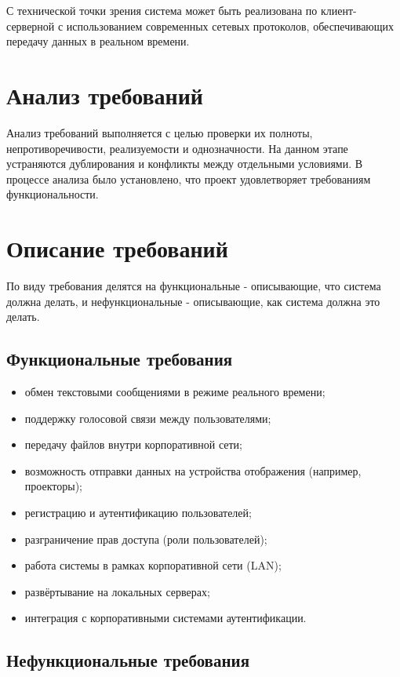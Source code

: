 \documentclass[14pt,a4paper]{extarticle}
\begin{document}
С технической точки зрения система может быть реализована по клиент-серверной с
использованием современных сетевых протоколов, обеспечивающих передачу данных в
реальном времени.

\section{Анализ требований}

Анализ требований выполняется с целью проверки их полноты, непротиворечивости, реализуемости и однозначности. На данном этапе устраняются дублирования и конфликты между отдельными условиями.
В процессе анализа было установлено, что проект удовлетворяет требованиям функциональности.

\section{Описание требований}

По виду требования делятся на функциональные - описывающие, что система должна делать, и нефункциональные - описывающие, как система должна это делать.

\subsection{Функциональные требования}

\begin{itemize}
    \item обмен текстовыми сообщениями в режиме реального времени;
    \item поддержку голосовой связи между пользователями;
    \item передачу файлов внутри корпоративной сети;
    \item возможность отправки данных на устройства отображения (например, проекторы);
    \item регистрацию и аутентификацию пользователей;
    \item разграничение прав доступа (роли пользователей);
    \item работа системы в рамках корпоративной сети (LAN);
    \item развёртывание на локальных серверах;
    \item интеграция с корпоративными системами аутентификации.
\end{itemize}

\subsection{Нефункциональные требования}
\end{document}
